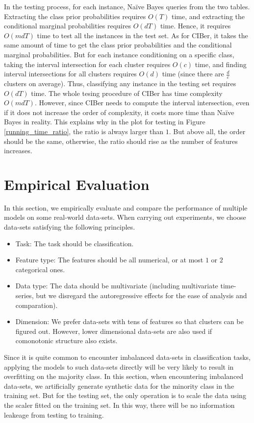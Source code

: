 \documentclass[twoside,11pt]{article}
\begin{document}
In the testing process, for each instance, Na\"ive Bayes queries from the two tables. Extracting the class prior probabilities requires $O(T)$ time, and extracting the conditional marginal probabilities requires $O(dT)$ time. Hence, it requires $O(mdT)$ time to test all the instances in the test set. As for CIBer, it takes the same amount of time to get the class prior probabilities and the conditional marginal probabilities. But for each instance conditioning on a specific class, taking the interval intersection for each cluster requires $O(c)$ time, and finding interval intersections for all clusters requires $O(d)$ time (since there are $\frac{d}{c}$ clusters on average). Thus, classifying any instance in the testing set requires $O(dT)$ time. The whole tesing procedure of CIBer has time complexity $O(mdT)$. However, since CIBer needs to compute the interval intersection, even if it does not increase the order of complexity, it costs more time than Na\"ive Bayes in reality. This explains why in the plot for testing in Figure \ref{running_time_ratio}, the ratio is always larger than $1$. But above all, the order should be the same, otherwise, the ratio should rise as the number of features increases.

\section{Empirical Evaluation}\label{empirical}
In this section, we empirically evaluate and compare the performance of multiple models on some real-world data-sets. When carrying out experiments, we choose data-sets satisfying the following principles.

\begin{itemize}
    \item Task: The task should be classification.
    \item Feature type: The features should be all numerical, or at most $1$ or $2$ categorical ones.
    \item Data type: The data should be multivariate (including multivariate time-series, but we disregard the autoregressive effects for the ease of analysis and comparation).
    \item Dimension: We prefer data-sets with tens of features so that clusters can be figured out. However, lower dimensional data-sets are also used if comonotonic structure also exists.
\end{itemize}

Since it is quite common to encounter imbalanced data-sets in classification tasks, applying the models to such data-sets directly will be very likely to result in overfitting on the majority class. In this section, when encountering imbalanced data-sets, we artificially generate synthetic data for the minority class in the training set. But for the testing set, the only operation is to scale the data using the scaler fitted on the training set. In this way, there will be no information leakeage from testing to training.
\end{document}
